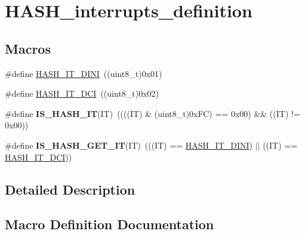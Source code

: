 \hypertarget{group___h_a_s_h__interrupts__definition}{}\section{H\+A\+S\+H\+\_\+interrupts\+\_\+definition}
\label{group___h_a_s_h__interrupts__definition}
\subsection*{Macros}
\begin{DoxyCompactItemize}
\item 
\#define \hyperlink{group___h_a_s_h__interrupts__definition_ga0df296dbab5028378cc21ad733eb5675}{H\+A\+S\+H\+\_\+\+I\+T\+\_\+\+D\+I\+N\+I}~((uint8\+\_\+t)0x01)
\item 
\#define \hyperlink{group___h_a_s_h__interrupts__definition_gab5285b1618e3fac906d7502261d9bb38}{H\+A\+S\+H\+\_\+\+I\+T\+\_\+\+D\+C\+I}~((uint8\+\_\+t)0x02)
\item 
\hypertarget{group___h_a_s_h__interrupts__definition_gabaf192c1ebff9bebe380d01b4c3006fe}{}\#define {\bfseries I\+S\+\_\+\+H\+A\+S\+H\+\_\+\+I\+T}(I\+T)~((((I\+T) \& (uint8\+\_\+t)0x\+F\+C) == 0x00) \&\& ((\+I\+T) != 0x00))\label{group___h_a_s_h__interrupts__definition_gabaf192c1ebff9bebe380d01b4c3006fe}

\item 
\hypertarget{group___h_a_s_h__interrupts__definition_gaf6b9b0113009e2bb8f8d462b714313af}{}\#define {\bfseries I\+S\+\_\+\+H\+A\+S\+H\+\_\+\+G\+E\+T\+\_\+\+I\+T}(I\+T)~(((I\+T) == \hyperlink{group___h_a_s_h__interrupts__definition_ga0df296dbab5028378cc21ad733eb5675}{H\+A\+S\+H\+\_\+\+I\+T\+\_\+\+D\+I\+N\+I}) $\vert$$\vert$ ((I\+T) == \hyperlink{group___h_a_s_h__interrupts__definition_gab5285b1618e3fac906d7502261d9bb38}{H\+A\+S\+H\+\_\+\+I\+T\+\_\+\+D\+C\+I}))\label{group___h_a_s_h__interrupts__definition_gaf6b9b0113009e2bb8f8d462b714313af}

\end{DoxyCompactItemize}


\subsection{Detailed Description}


\subsection{Macro Definition Documentation}
\hypertarget{group___h_a_s_h__interrupts__definition_gab5285b1618e3fac906d7502261d9bb38}{}
